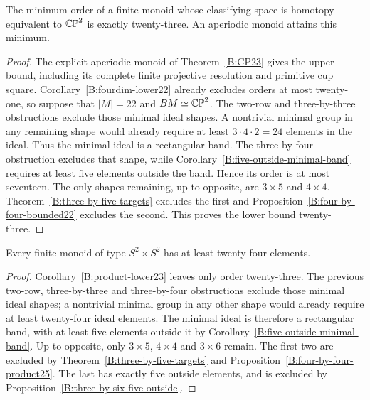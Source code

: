 \begin{theorem}\label{B:CP2-minimum23}
The minimum order of a finite monoid whose classifying space is
homotopy equivalent to $\mathbb {CP}^2$ is exactly twenty-three.
An aperiodic monoid attains this minimum.
\end{theorem}
\begin{proof}
The explicit aperiodic monoid of Theorem~\ref{B:CP23} gives
the upper bound, including its complete finite projective resolution
and primitive cup square.  Corollary~\ref{B:fourdim-lower22}
already excludes orders at most twenty-one, so suppose that
$|M|=22$ and $BM\simeq\mathbb {CP}^2$.
The two-row and three-by-three obstructions exclude those minimal
ideal shapes.  A nontrivial minimal group in any remaining shape
would already require at least $3\cdot4\cdot2=24$ elements
in the ideal.  Thus the minimal ideal is a rectangular band.
The three-by-four obstruction excludes that shape, while
Corollary~\ref{B:five-outside-minimal-band} requires at least
five elements outside the band.  Hence its order is at most
seventeen.  The only shapes remaining, up to opposite, are
$3\times5$ and $4\times4$.
Theorem~\ref{B:three-by-five-targets} excludes the first and
Proposition~\ref{B:four-by-four-bounded22} excludes the second.
This proves the lower bound twenty-three.
\end{proof}







\begin{corollary}\label{B:product-lower24}
Every finite monoid of type $S^2\times S^2$ has at least
twenty-four elements.
\end{corollary}
\begin{proof}
Corollary~\ref{B:product-lower23} leaves only order twenty-three.
The previous two-row, three-by-three and three-by-four obstructions
exclude those minimal ideal shapes; a nontrivial minimal group
in any other shape would already require at least twenty-four
ideal elements.  The minimal ideal is therefore a rectangular
band, with at least five elements outside it by
Corollary~\ref{B:five-outside-minimal-band}.
Up to opposite, only $3\times5$, $4\times4$ and $3\times6$
remain.  The first two are excluded by
Theorem~\ref{B:three-by-five-targets} and
Proposition~\ref{B:four-by-four-product25}.
The last has exactly five outside elements, and is excluded by
Proposition~\ref{B:three-by-six-five-outside}.
\end{proof}


